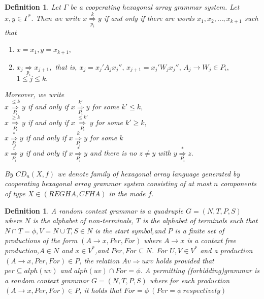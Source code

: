 \documentclass[11pt]{article}
\newtheorem{definition}[theorem]{Definition}
\begin{document}
\begin{definition}Let $\Gamma$ be a cooperating hexagonal array grammar system. Let $x,y\in \Gamma^*.$ Then we write $x\underset{p_i}{\overset{k}{\Rightarrow}}y$ if and only if there are words $x_1,x_2,\ldots,x_{k+1}$ such that
\begin{enumerate}
\item $x=x_1,y=x_{k+1},$ \item $x_j\underset{p_i}\Rightarrow
x_{j+1},$ that is,
$x_j=x_j'A_jx_j'',\,x_{j+1}=x_j'W_jx_j'',\,A_j\rightarrow W_j\in
P_i,\,$ $1\le j\le k.$
\end{enumerate}

Moreover, we write\\
\indent\indent$x\underset{P_i}{\overset{\le k}{\Rightarrow}}y$ if and only if $x\underset{P_i}{\overset{k'}{\Rightarrow}}y$ for some $k'\le k,$\\
\indent\indent $x\underset{P_i}{\overset{\ge k}{\Rightarrow}}y$ if and only if $x\underset{P_i}{\overset{\le k'}{\Rightarrow}}y$ for some $k'\ge k,$\\
\indent\indent $x\underset{P_i}{\overset{*}{\Rightarrow}}y$ if and only if $x\underset{P_i}{\overset{k}{\Rightarrow}}y$ for some $k$\\
\indent\indent $x\underset{P_i}{\overset{t}{\Rightarrow}}y$ if and only if $x\underset{P_i}{\overset{*}{\Rightarrow}}y$ and there is no $z\ne y$ with $y\underset{P_i}{\overset{*}{\Rightarrow}}z.$

By $CD_n(X,f)$ we denote family of hexagonal array language
generated by cooperating hexagonal array grammar system consisting
of at most $n$ components of type $X\in(REGHA,CFHA)$ in the mode
$f.$
\end{definition}
\begin{definition}
A random context grammar is a quadruple $G=(N,T,P,S)$ where $N$ is
the alphabet of non-terminals, $T$ is the alphabet of terminals
such that $N\cap T=\phi, V=N\cup T,S\in N$ is the start symbol,and
$P$ is a finite set of productions of the form $(A\rightarrow
x,Per,For)$ where $A\rightarrow x$ is a context free
production,$A\in N$ and $x\in V^{\ast}$,and $Per,For\subseteq N$.
For $U,V\in V^{\ast}$ and a production $(A\rightarrow
x,Per,For)\in P$, the relation $Av\Rightarrow uxv$ holds provided
that $per\subseteq alph(uv)$ and $alph(uv)\cap For=\phi$. A
permitting (forbidding)grammar is a random context grammar
$G=(N,T,P,S)$ where for each production\\ $(A\rightarrow
x,Per,For)\in P$, it holds that $For=\phi ~(Per=\phi~
respectively)$
\end{definition}
\end{document}
